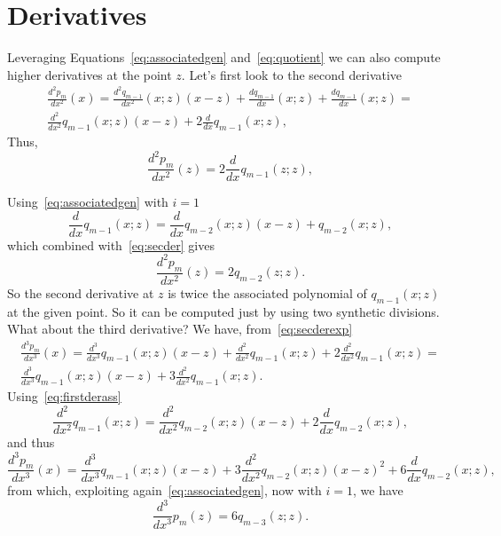 \documentclass[10pt,a4paper]{article}
\theoremstyle{definition}%
\begin{document}
\section{Derivatives}
Leveraging Equations~\eqref{eq:associatedgen} and~\eqref{eq:quotient} we can also compute higher derivatives at the point $z$. Let's first look to the second derivative
\begin{multline}\label{eq:secderexp}
\frac{d^2p_m}{dx^2}(x)=\frac{d^2q_{m-1}}{dx^2}(x;z)(x-z) + \frac{dq_{m-1}}{dx} (x;z) + \frac{dq_{m-1}}{dx} (x;z)=\\ \frac{d^2}{dx^2}q_{m-1}(x;z)(x-z) + 2 \frac{d}{dx} q_{m-1}(x;z),
\end{multline}
Thus,
\begin{equation}\label{eq:secder}
\frac{d^2p_m}{dx^2}(z)=2 \frac{d}{dx} q_{m-1}(z;z),
\end{equation}

Using~\eqref{eq:associatedgen} with $i=1$
\begin{equation}\label{eq:firstderass}
\frac{d}{dx}q_{m-1}(x;z)=\frac{d}{dx}q_{m-2}(x;z)(x-z)+ q_{m-2}(x;z),
\end{equation}
which combined with~\eqref{eq:secder} gives
\begin{equation}\label{eq:secderivative}
\frac{d^2p_m}{dx^2}(z)=2 q_{m-2}(z;z).
\end{equation}
So the second derivative at $z$ is twice the associated polynomial of $q_{m-1}(x;z)$ at the given point. So it can be computed just by using two synthetic divisions.
What about the third derivative? We have, from~\eqref{eq:secderexp}
\begin{multline}\label{eq:secderexp}
\frac{d^3p_m}{dx^3}(x)=\frac{d^3}{dx^3}q_{m-1}(x;z)(x-z) +\frac{d^2}{dx^2}q_{m-1}(x;z) + 2 \frac{d^2}{dx^2} q_{m-1}(x;z)=\\
\frac{d^3}{dx^3}q_{m-1}(x;z)(x-z) +3\frac{d^2}{dx^2}q_{m-1}(x;z).
\end{multline}
Using~\eqref{eq:firstderass}
\begin{equation}
\frac{d^2}{dx^2}q_{m-1}(x;z)=\frac{d^2}{dx^2}q_{m-2}(x;z)(x-z)+2\frac{d}{dx}q_{m-2}(x;z),
\end{equation}
and thus
\begin{equation}\label{eq:thirdder}
\frac{d^3p_m}{dx^3}(x)=
\frac{d^3}{dx^3}q_{m-1}(x;z)(x-z) +3\frac{d^2}{dx^2}q_{m-2}(x;z)(x-z)^2 + 6\frac{d}{dx}q_{m-2}(x;z),
\end{equation}
from which, exploiting again~\eqref{eq:associatedgen}, now with $i=1$, we have
\begin{equation}\label{eq:thirdderz}
\frac{d^3}{dx^3}p_m(z)=6 q_{m-3}(z;z).
\end{equation}
\end{document}
